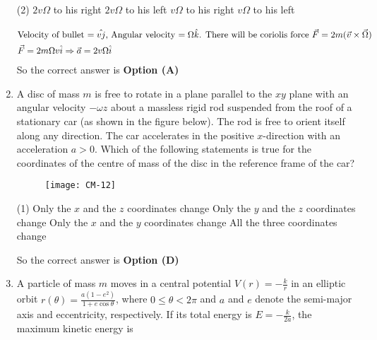 \begin{enumerate}
\begin{tasks}(2)
\task[\textbf{A.}]  $2 v \Omega$ to his right
\task[\textbf{B.}] $2 v \Omega$ to his left
\task[\textbf{C.}] $v \Omega$ to his right
\task[\textbf{D.}] $v \Omega$ to his left
\end{tasks}
\begin{answer}
\begin{align*}
\intertext{Velocity of bullet $=\hat{v j}$, Angular velocity $=\Omega \hat{k}$. There will be coriolis force $\vec{F}=2 m(\vec{v} \times \vec{\Omega})$}
\vec{F}&=2 m \Omega v \hat{i} \Rightarrow \vec{a}=2 v \Omega \hat{i}
\end{align*}
So the correct answer is \textbf{Option (A)}
\end{answer}
	\item A disc of mass $m$ is free to rotate in a plane parallel to the $x y$ plane with an angular velocity $-\omega \hat{z}$ about a massless rigid rod suspended from the roof of a stationary car (as shown in the figure below). The rod is free to orient itself along any direction. The car accelerates in the positive $x$-direction with an acceleration $a>0 .$ Which of the following statements is true for the coordinates of the centre of mass of the disc in the reference frame of the car?

\begin{figure}[H]
\centering
\texttt{[image: CM-12]}
\end{figure}
\begin{tasks}(1)
\task[\textbf{A.}] Only the $x$ and the $z$ coordinates change
\task[\textbf{B.}] Only the $y$ and the $z$ coordinates change
\task[\textbf{C.}] Only the $x$ and the $y$ coordinates change
\task[\textbf{D.}] All the three coordinates change
\end{tasks}
\begin{answer}
So the correct answer is \textbf{Option (D)}
\end{answer}
	\item A particle of mass $m$ moves in a central potential $V(r)=-\frac{k}{r}$ in an elliptic orbit $r(\theta)=\frac{a\left(1-e^{2}\right)}{1+e \cos \theta}$, where $0 \leq \theta<2 \pi$ and $a$ and $e$ denote the semi-major axis and eccentricity, respectively. If its total energy is $E=-\frac{k}{2 a}$, the maximum kinetic energy is


\end{enumerate}
